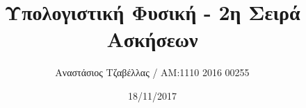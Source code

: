 \documentclass[11pt]{article}
\begin{document}
\title{Υπολογιστική Φυσική - 2η Σειρά Ασκήσεων}
\author{Αναστάσιος Τζαβέλλας / ΑΜ:1110 2016 00255}
\date{18/11/2017}
\maketitle












\end{document}
